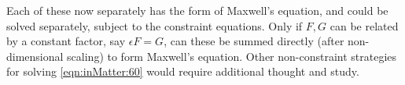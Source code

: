Each of these now separately has the form of Maxwell's equation, and could be solved separately, subject to the constraint equations.
Only if \( F, G \) can be related by a constant factor, say \( \epsilon F = G \), can these be summed directly (after non-dimensional scaling) to form Maxwell's equation.
Other non-constraint strategies for solving \cref{eqn:inMatter:60} would require additional thought and study.
